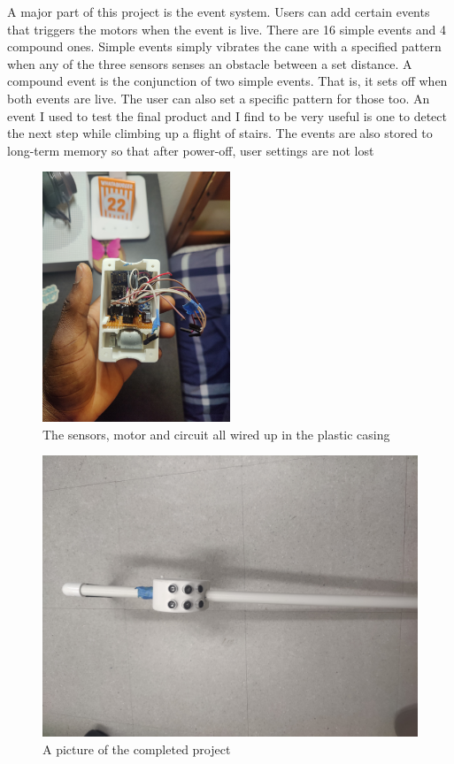\documentclass[11pt]{article}
\begin{document}
A major part of this project is the event system. Users can add certain events that triggers the motors when the event is live. There are 16 simple events and 4 compound ones.
Simple events simply vibrates the cane with a specified pattern when any of the three sensors senses an obstacle between a set distance. A compound event is the conjunction of
two simple events. That is, it sets off when both events are live. The user can also set a specific pattern for those too. An event I used to test the final product and I find
to be very useful is one to detect the next step while climbing up a flight of stairs. The events are also stored to long-term memory so that after power-off, user settings are not lost

\begin{figure}[H]
\centering
\includegraphics[width=0.5\textwidth]{./images/guts.jpg}
\caption{The sensors, motor and circuit all wired up in the plastic casing}
\end{figure}

\begin{figure}[H]
\centering
\includegraphics[width=.9\linewidth]{./images/final.jpg}
\caption{A picture of the completed project}
\end{figure} 
\end{document}
